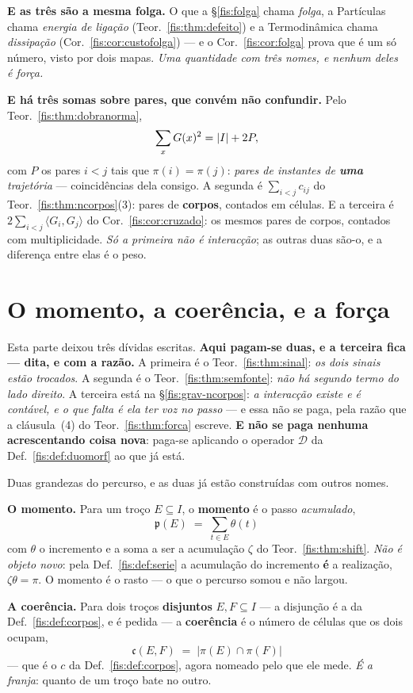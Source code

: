 \documentclass[livro.tex]{subfiles}
\begin{document}
\medskip\noindent\textbf{E as três são a mesma folga.} O que a
§\ref{fis:folga} chama \emph{folga}, a Partículas chama \emph{energia de
ligação} (Teor.~\ref{fis:thm:defeito}) e a Termodinâmica chama \emph{dissipação}
(Cor.~\ref{fis:cor:custofolga}) --- e o Cor.~\ref{fis:cor:folga} prova que é um
só número, visto por dois mapas. \emph{Uma quantidade com três nomes, e nenhum
deles é força.}

\medskip\noindent\textbf{E há três somas sobre pares, que convém não confundir.}
Pelo Teor.~\ref{fis:thm:dobranorma},
\[
\sum_{x}G(x)^{2}=\lvert I\rvert+2P ,
\]
com $P$ os pares $i<j$ tais que $\pi(i)=\pi(j)$: \emph{pares de instantes de
\textbf{uma} trajetória} --- coincidências dela consigo. A segunda é
$\sum_{i<j}c_{ij}$ do Teor.~\ref{fis:thm:ncorpos}(3): pares de \textbf{corpos},
contados em células. E a terceira é $2\sum_{i<j}\langle G_i,G_j\rangle$ do
Cor.~\ref{fis:cor:cruzado}: os mesmos pares de corpos, contados com
multiplicidade. \emph{Só a primeira não é interacção}; as outras duas são-o, e a
diferença entre elas é o peso.

\section{O momento, a coerência, e a força}\label{fis:grav-forca}

\noindent Esta parte deixou três dívidas escritas. \textbf{Aqui pagam-se duas, e
a terceira fica --- dita, e com a razão.} A primeira é o
Teor.~\ref{fis:thm:sinal}: \emph{os dois sinais estão trocados}. A segunda é o
Teor.~\ref{fis:thm:semfonte}: \emph{não há segundo termo do lado direito}. A
terceira está na §\ref{fis:grav-ncorpos}: \emph{a interacção existe e é contável,
e o que falta é ela ter voz no passo} --- e essa não se paga, pela razão que a
cláusula~(4) do Teor.~\ref{fis:thm:forca} escreve. \textbf{E não se paga nenhuma
acrescentando coisa nova}: paga-se aplicando o operador $\mathcal{D}$ da
Def.~\ref{fis:def:duomorf} ao que já está.

\begin{definicao}\label{fis:def:momcoer}
Duas grandezas do percurso, e as duas já estão construídas com outros nomes.

\medskip\noindent\textbf{O momento.} Para um troço $E\subseteq I$, o
\textbf{momento} é o passo \emph{acumulado},
\[
\boxed{\;\mathfrak{p}(E)\;=\;\sum_{t\in E}\theta(t)\;}
\]
com $\theta$ o incremento e a soma a ser a acumulação $\zeta$ do
Teor.~\ref{fis:thm:shift}. \emph{Não é objeto novo}: pela
Def.~\ref{fis:def:serie} a acumulação do incremento \textbf{é} a realização,
$\zeta\theta=\pi$. O momento é o rasto --- o que o percurso somou e não largou.

\medskip\noindent\textbf{A coerência.} Para dois troços \textbf{disjuntos}
$E,F\subseteq I$ --- a disjunção é a da Def.~\ref{fis:def:corpos}, e é pedida ---
a \textbf{coerência} é o número de células que os dois ocupam,
\[
\boxed{\;\mathfrak{c}(E,F)\;=\;\bigl\lvert\pi(E)\cap\pi(F)\bigr\rvert\;}
\]
--- que é o $c$ da Def.~\ref{fis:def:corpos}, agora nomeado pelo que ele mede.
\emph{É a franja}: quanto de um troço bate no outro.
\end{definicao}
\end{document}
